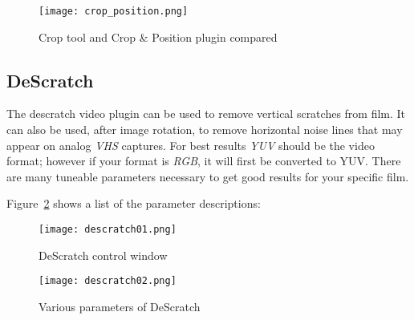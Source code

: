 \begin{figure}[htpb]
	\centering
	\texttt{[image: crop\_position.png]}
	\caption{Crop tool and Crop \& Position plugin compared}
	\label{fig:crop_position}
\end{figure}

\subsection{DeScratch}%
\label{sub:descratch}

The descratch video plugin can be used to remove vertical scratches
from film. It can also be used, after image rotation, to remove
horizontal noise lines that may appear on analog \textit{VHS}
captures. For best results \textit{YUV} should be the video format;
however if your format is \textit{RGB}, it will first be converted
to YUV\@. There are many tuneable parameters necessary to get good
results for your specific film.

Figure~\ref{fig:descratch01} shows a list of the parameter descriptions:

\begin{figure}[htpb]
    \centering
    \texttt{[image: descratch01.png]}
    \caption{DeScratch control window}
    \label{fig:descratch01}
\end{figure}

\begin{figure}[htpb]
    \centering
    \texttt{[image: descratch02.png]}
    \caption{Various parameters of DeScratch}
    \label{fig:descratch02}
\end{figure}

